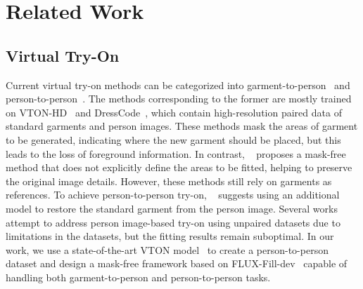 \section{Related Work}
\label{sec:related}

\subsection{Virtual Try-On}
Current virtual try-on methods can be categorized into garment-to-person~\cite{choi2021viton, morelli2022dress, kim2024stableviton, choi2024improving, xu2024ootdiffusion, zhang2024boow, catvton-flux} and person-to-person~\cite{xie2022pasta, cui2024street}. The methods corresponding to the former are mostly trained on VTON-HD~\cite{choi2021viton} and DressCode~\cite{morelli2022dress}, which contain high-resolution paired data of standard garments and person images. These methods mask the areas of garment to be generated, indicating where the new garment should be placed, but this leads to the loss of foreground information. In contrast, ~\cite{zhang2024boow} proposes a mask-free method that does not explicitly define the areas to be fitted, helping to preserve the original image details. However, these methods still rely on garments as references. To achieve person-to-person try-on, ~\cite{zeng2020TileGAN, velioglu2024tryoffdiff,xarchakos2024tryoffanyonetiledclothgeneration, tan2024ragdiffusion} suggests using an additional model to restore the standard garment from the person image. Several works~\cite{xie2022pasta,cui2024street} attempt to address person image-based try-on using unpaired datasets due to limitations in the datasets, but the fitting results remain suboptimal. In our work, we use a state-of-the-art VTON model~\cite{choi2024improving} to create a person-to-person dataset and design a mask-free framework based on FLUX-Fill-dev~\cite{flux} capable of handling both garment-to-person and person-to-person tasks.